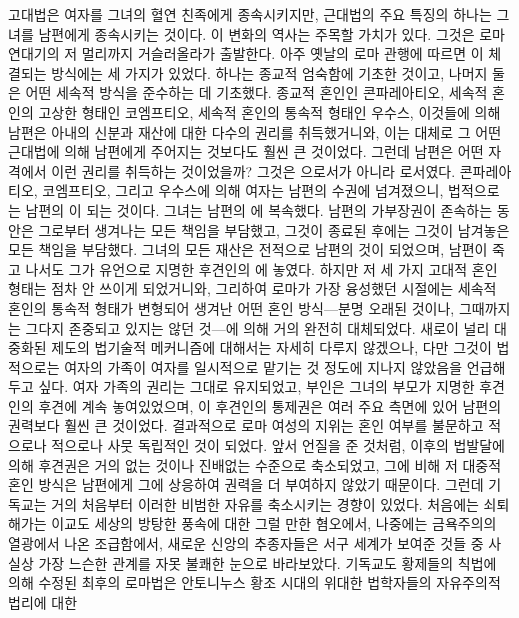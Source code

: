 고대법은 여자를 그녀의 혈연 친족에게 종속시키지만,
근대법의 주요 특징의 하나는 그녀를 남편에게 종속시키는 것이다.
이 변화의 역사는 주목할 가치가 있다.
그것은 로마 연대기의 저 멀리까지 거슬러올라가 출발한다.
아주 옛날의 로마 관행에 따르면
이 체결되는
방식에는
세 가지가
있었다.
하나는 종교적 엄숙함에 기초한 것이고,
나머지 둘은 어떤 세속적 방식을 준수하는 데 기초했다.
종교적 혼인인 콘파레아티오,
세속적 혼인의 고상한 형태인 코엠프티오,
세속적 혼인의 통속적 형태인 우수스,
이것들에 의해 남편은 아내의 신분과 재산에 대한 다수의 권리를 취득했거니와,
이는 대체로 그 어떤 근대법에 의해 남편에게 주어지는 것보다도 훨씬 큰 것이었다.
그런데 남편은 어떤 자격에서 이런 권리를 취득하는 것이었을까?
그것은 으로서가 아니라 로서였다.
콘파레아티오, 코엠프티오, 그리고 우수스에 의해
여자는 남편의 수권에 넘겨졌으니,
법적으로는 남편의 이 되는 것이다.
그녀는 남편의 에 복속했다.
남편의 가부장권이 존속하는 동안은 그로부터 생겨나는 모든 책임을 부담했고,
그것이 종료된 후에는 그것이 남겨놓은 모든 책임을 부담했다.
그녀의 모든 재산은 전적으로 남편의 것이 되었으며,
남편이 죽고 나서도 그가 유언으로 지명한 후견인의 에 놓였다.
하지만
저 세 가지 고대적 혼인 형태는 점차 안 쓰이게 되었거니와,
그리하여 로마가 가장 융성했던 시절에는
세속적 혼인의 통속적 형태가 변형되어 생겨난 어떤 혼인 방식---분명
오래된 것이나, 그때까지는 그다지 존중되고 있지는 않던 것---에 의해
거의 완전히 대체되었다.
새로이 널리 대중화된 제도의 법기술적 메커니즘에 대해서는 자세히 다루지
않겠으나, 다만 그것이 법적으로는
여자의 가족이 여자를 일시적으로 맡기는 것 정도에
지나지 않았음을 언급해두고 싶다.
여자 가족의 권리는 그대로 유지되었고,
부인은 그녀의 부모가 지명한 후견인의 후견에 계속 놓여있었으며,
이 후견인의 통제권은
여러 주요 측면에 있어
남편의 권력보다 훨씬 큰 것이었다.
결과적으로 로마 여성의 지위는
혼인 여부를 불문하고
적으로나 적으로나 사뭇 독립적인 것이 되었다.
앞서 언질을 준 것처럼, 이후의 법발달에 의해
후견권은 거의 없는 것이나 진배없는 수준으로 축소되었고,
그에 비해 저 대중적 혼인 방식은 남편에게 그에 상응하여
권력을 더 부여하지 않았기 때문이다.
그런데 기독교는 거의 처음부터 이러한 비범한 자유를 축소시키는 경향이 있었다.
처음에는 쇠퇴해가는 이교도 세상의 방탕한 풍속에 대한 그럴 만한 혐오에서,
나중에는 금욕주의의 열광에서 나온 조급함에서,
새로운 신앙의 추종자들은 서구 세계가 보여준 것들 중
사실상 가장 느슨한 관계를 자못 불쾌한 눈으로 바라보았다.
기독교도 황제들의 칙법에 의해 수정된 최후의 로마법은
안토니누스 황조 시대의 위대한 법학자들의 자유주의적 법리에 대한
